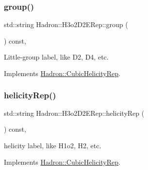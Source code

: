 \mbox{\label{structHadron_1_1H3o2D2ERep_ad9d9eb7585ef277acd3efb48c5912c95}} 
\subsubsection{\texorpdfstring{group()}{group()}\hspace{0.1cm}{\footnotesize\ttfamily [5/5]}}
{\footnotesize\ttfamily std\+::string Hadron\+::\+H3o2\+D2\+E\+Rep\+::group (\begin{DoxyParamCaption}{ }\end{DoxyParamCaption}) const\hspace{0.3cm}{\ttfamily [inline]}, {\ttfamily [virtual]}}

Little-\/group label, like D2, D4, etc. 

Implements \mbox{\hyperlink{structHadron_1_1CubicHelicityRep_a101a7d76cd8ccdad0f272db44b766113}{Hadron\+::\+Cubic\+Helicity\+Rep}}.

\mbox{\label{structHadron_1_1H3o2D2ERep_ad3100dd02c2f3ec837e4d589a732d956}} 
\subsubsection{\texorpdfstring{helicityRep()}{helicityRep()}\hspace{0.1cm}{\footnotesize\ttfamily [1/3]}}
{\footnotesize\ttfamily std\+::string Hadron\+::\+H3o2\+D2\+E\+Rep\+::helicity\+Rep (\begin{DoxyParamCaption}{ }\end{DoxyParamCaption}) const\hspace{0.3cm}{\ttfamily [inline]}, {\ttfamily [virtual]}}

helicity label, like H1o2, H2, etc. 

Implements \mbox{\hyperlink{structHadron_1_1CubicHelicityRep_af1096946b7470edf0a55451cc662f231}{Hadron\+::\+Cubic\+Helicity\+Rep}}.

\mbox{\label{structHadron_1_1H3o2D2ERep_ad3100dd02c2f3ec837e4d589a732d956}} 
